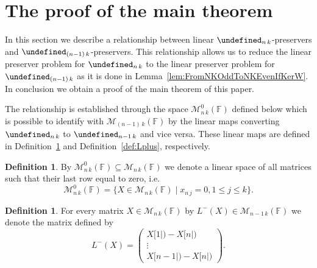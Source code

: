 \documentclass{elsarticle}
\DeclareMathOperator{\rad}{rad}
\def\F{{\mathbb F}}
\def\M{{\mathcal M}}
\let\det\undefined
\DeclareMathOperator{\det}{det}
\theoremstyle{plain}
\newtheorem{lemma}[theorem]{Lemma}
\theoremstyle{definition}
\newtheorem{definition}[theorem]{Definition}
\numberwithin{equation}{section}
\begin{document}
%

\section{The proof of the main theorem}\label{sec:maintheorem}
In this section we describe a relationship between linear $\det_{n\,k}$-preservers and $\det_{(n-1)\,k}$-preservers. This relationship allows us to reduce the linear preserver problem for $\det_{n\,k}$ to the linear preserver problem for $\det_{(n-1)\,k}$ as it is done in Lemma~\ref{lem:FromNKOddToNKEvenIfKerW}. In conclusion we obtain a proof of the main theorem of this paper.

The relationship is established through the space $\M^0_{n\,k}(\F)$ defined below which is possible to identify with $\M_{(n-1)\,k}(\F)$ by the linear maps converting $\det_{n\,k}$ to $\det_{n-1\,k}$ and vice versa. These linear maps are defined in Definition~\ref{def:Lminus} and Definition~\ref{def:Lplus}, respectively.

\begin{definition}
  By $\M^{0}_{n\,k}(\F) \subseteq \M_{n\,k}(\F)$ we denote a linear space of all matrices such that their last row equal to zero, i.e.
  \[
    \M^{0}_{n\,k}(\F) = \{X \in \M_{n\,k}(\F) \mid x_{n\,j} = 0, 1 \le j \le k\}.
  \]
\end{definition}

\begin{definition}\label{def:Lminus}
For every matrix $X \in \M_{n\,k}(\mathbb F)$ by $L^{-}(X) \in \M_{n-1\,k} (\mathbb F)$ we denote the matrix defined by
\[
L^{-}(X) = \begin{pmatrix}X[1|) - X[n|)\\ \vdots \\X[n-1|) - X[n|)\end{pmatrix}.
\]

\end{definition}
\end{document}
